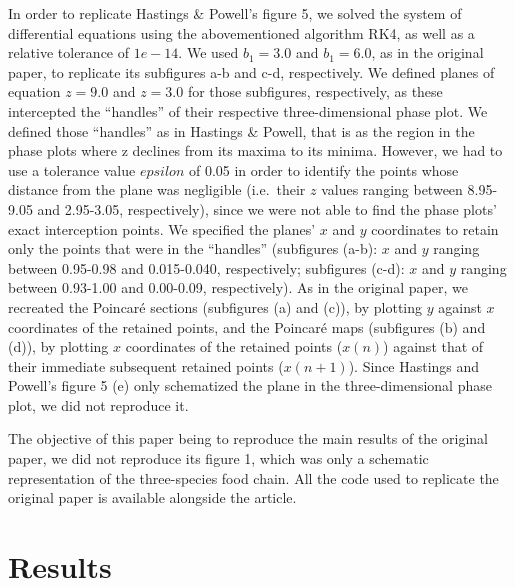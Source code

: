 \documentclass[
]{article}
\begin{document}
In order to replicate Hastings \& Powell's figure 5, we solved the
system of differential equations using the abovementioned algorithm RK4,
as well as a relative tolerance of \(1e-14\). We used \(b_1 = 3.0\) and
\(b_1 = 6.0\), as in the original paper, to replicate its subfigures a-b
and c-d, respectively. We defined planes of equation \(z = 9.0\) and
\(z = 3.0\) for those subfigures, respectively, as these intercepted the
``handles'' of their respective three-dimensional phase plot. We defined
those ``handles'' as in Hastings \& Powell, that is as the region in the
phase plots where z declines from its maxima to its minima. However, we
had to use a tolerance value \(epsilon\) of 0.05 in order to identify
the points whose distance from the plane was negligible (i.e.~their
\(z\) values ranging between 8.95-9.05 and 2.95-3.05, respectively),
since we were not able to find the phase plots' exact interception
points. We specified the planes' \(x\) and \(y\) coordinates to retain
only the points that were in the ``handles'' (subfigures (a-b): \(x\)
and \(y\) ranging between 0.95-0.98 and 0.015-0.040, respectively;
subfigures (c-d): \(x\) and \(y\) ranging between 0.93-1.00 and
0.00-0.09, respectively). As in the original paper, we recreated the
Poincaré sections (subfigures (a) and (c)), by plotting \(y\) against
\(x\) coordinates of the retained points, and the Poincaré maps
(subfigures (b) and (d)), by plotting \(x\) coordinates of the retained
points (\(x(n)\)) against that of their immediate subsequent retained
points (\(x(n+1)\)). Since Hastings and Powell's figure 5 (e) only
schematized the plane in the three-dimensional phase plot, we did not
reproduce it.

The objective of this paper being to reproduce the main results of the
original paper, we did not reproduce its figure 1, which was only a
schematic representation of the three-species food chain. All the code
used to replicate the original paper is available alongside the article.

\hypertarget{results}{%
\section{Results}\label{results}}
\end{document}
